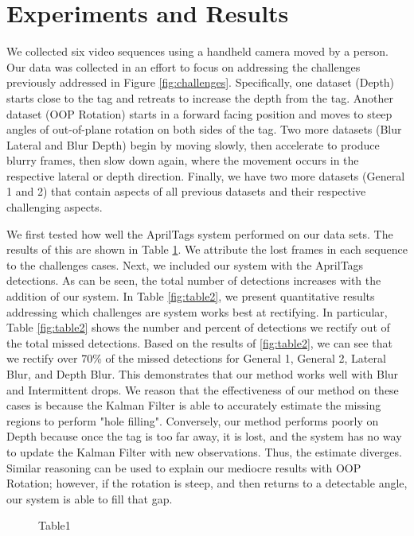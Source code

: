 \documentclass[12pt]{article}
\begin{document}
\section{Experiments and Results}
\label{sec:results}
We collected six video sequences using a handheld camera moved by a person. Our data was collected in an effort to focus on addressing the challenges previously addressed in Figure \ref{fig:challenges}. Specifically, one dataset (Depth) starts close to the tag and retreats to increase the depth from the tag. Another dataset (OOP Rotation) starts in a forward facing position and moves to steep angles of out-of-plane rotation on both sides of the tag. Two more datasets (Blur Lateral and Blur Depth) begin by moving slowly, then accelerate to produce blurry frames, then slow down again, where the movement occurs in the respective lateral or depth direction. Finally, we have two more datasets (General 1 and 2) that contain aspects of all previous datasets and their respective challenging aspects.

We first tested how well the AprilTags system performed on our data sets. The results of this are shown in Table \ref{fig:table1}. We attribute the lost frames in each sequence to the challenges cases. Next, we included our system with the AprilTags detections. As can be seen, the total number of detections increases with the addition of our system. In Table \ref{fig:table2}, we present quantitative results addressing which challenges are system works best at rectifying. In particular, Table \ref{fig:table2} shows the number and percent of detections we rectify out of the total missed detections. Based on the results of \ref{fig:table2}, we can see that we rectify over 70\% of the missed detections for General 1, General 2, Lateral Blur, and Depth Blur. This demonstrates that our method works well with Blur and Intermittent drops. We reason that the effectiveness of our method on these cases is because the Kalman Filter is able to accurately estimate the missing regions to perform "hole filling". Conversely, our method performs poorly on Depth because once the tag is too far away, it is lost, and the system has no way to update the Kalman Filter with new observations. Thus, the estimate diverges. Similar reasoning can be used to explain our mediocre results with OOP Rotation; however, if the rotation is steep, and then returns to a detectable angle, our system is able to fill that gap.

\begin{figure}
\centering
\caption{Table1}
\label{fig:table1}
\end{figure}
\end{document}
